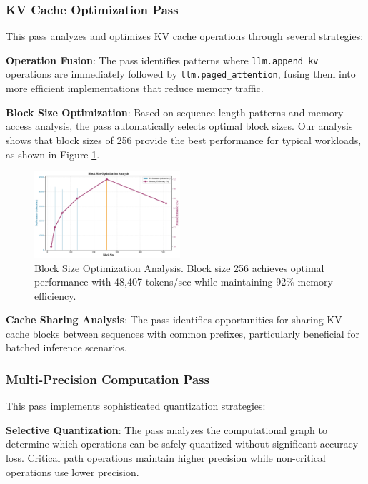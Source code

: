 \documentclass[conference]{IEEEtran}
\begin{document}
\subsubsection{KV Cache Optimization Pass}

This pass analyzes and optimizes KV cache operations through several strategies:

\textbf{Operation Fusion}: The pass identifies patterns where \texttt{llm.append\_kv} operations are immediately followed by \texttt{llm.paged\_attention}, fusing them into more efficient implementations that reduce memory traffic.

\textbf{Block Size Optimization}: Based on sequence length patterns and memory access analysis, the pass automatically selects optimal block sizes. Our analysis shows that block sizes of 256 provide the best performance for typical workloads, as shown in Figure \ref{fig:block_optimization}.

\begin{figure}[htbp]
\centering
\includegraphics[width=0.48\textwidth]{figures/block_size_optimization.pdf}
\caption{Block Size Optimization Analysis. Block size 256 achieves optimal performance with 48,407 tokens/sec while maintaining 92\% memory efficiency.}
\label{fig:block_optimization}
\end{figure}

\textbf{Cache Sharing Analysis}: The pass identifies opportunities for sharing KV cache blocks between sequences with common prefixes, particularly beneficial for batched inference scenarios.

\subsubsection{Multi-Precision Computation Pass}

This pass implements sophisticated quantization strategies:

\textbf{Selective Quantization}: The pass analyzes the computational graph to determine which operations can be safely quantized without significant accuracy loss. Critical path operations maintain higher precision while non-critical operations use lower precision.
\end{document}
